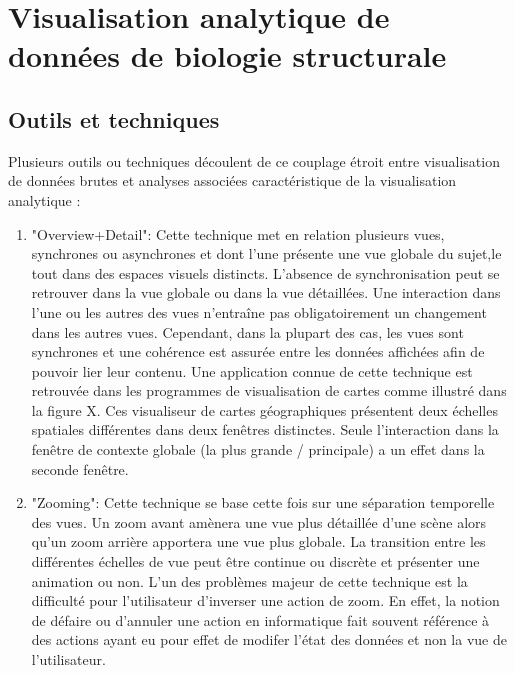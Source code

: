 \section{Visualisation analytique de données de biologie structurale}
\label{Sec:visuAnalyticsStructBio}

\subsection{Outils et techniques}

Plusieurs outils ou techniques découlent de ce couplage étroit entre visualisation de données brutes et analyses associées caractéristique de la visualisation analytique \cite{cockburn2008review}:

\begin{enumerate}
    \item "Overview+Detail": Cette technique met en relation plusieurs vues, synchrones ou asynchrones et dont l'une présente une vue globale du sujet,le tout dans des espaces visuels distincts. L'absence de synchronisation peut se retrouver dans la vue globale ou dans la vue détaillées. Une interaction dans l'une ou les autres des vues n'entraîne pas obligatoirement un changement dans les autres vues. Cependant, dans la plupart des cas, les vues sont synchrones et une cohérence est assurée entre les données affichées afin de pouvoir lier leur contenu. Une application connue de cette technique est retrouvée dans les programmes de visualisation de cartes comme illustré dans la figure X. Ces visualiseur de cartes géographiques présentent deux échelles spatiales différentes dans deux fenêtres distinctes. Seule l'interaction dans la fenêtre de contexte globale (la plus grande / principale) a un effet dans la seconde fenêtre.
    \item "Zooming": Cette technique se base cette fois sur une séparation temporelle des vues. Un zoom avant amènera une vue plus détaillée d'une scène alors qu'un zoom arrière apportera une vue plus globale. La transition entre les différentes échelles de vue peut être continue ou discrète et présenter une animation ou non. L'un des problèmes majeur de cette technique est la difficulté pour l'utilisateur d'inverser une action de zoom. En effet, la notion de défaire ou d'annuler une action en informatique fait souvent référence à des actions ayant eu pour effet de modifer l'état des données et non la vue de l'utilisateur.

\end{enumerate}
